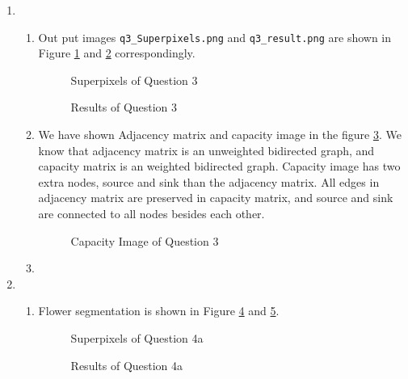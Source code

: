 \documentclass[12pt]{article}
\begin{document}
\begin{enumerate}
	


	\item
	\begin{enumerate}
		\item 
		 Out put images  \texttt{q3\_Superpixels.png} and \texttt{q3\_result.png} are shown in Figure \ref{fig:q3_1} and \ref{fig:q3_2} correspondingly.
		\begin{figure}[H]
			\centering{}
			\caption{Superpixels of Question 3}
			\label{fig:q3_1}
		\end{figure}
		\begin{figure}[H]
			\centering{}
			\caption{Results of Question 3}
			\label{fig:q3_2}
		\end{figure}
	
	\item We have shown Adjacency matrix and capacity image in the figure \ref{fig:q3_3}. We know that adjacency matrix is an unweighted bidirected graph, and capacity matrix is an weighted bidirected graph. Capacity image has two extra nodes, source and sink than the adjacency matrix. All edges in adjacency matrix are preserved in capacity matrix, and source and sink are connected to all nodes besides each other.
	\begin{figure}[H]
		\centering{}
		\caption{Capacity Image of Question 3}
		\label{fig:q3_3}
	\end{figure}

	\item 
	\end{enumerate}

	\item \begin{enumerate}
		\item Flower segmentation is shown in Figure \ref{fig:q4_1_1} and \ref{fig:q4_1_2}.
		\begin{figure}[H]
			\centering{}
			\caption{Superpixels of Question 4a}
			\label{fig:q4_1_1}
		\end{figure}
		\begin{figure}[H]
			\centering{}
			\caption{Results of Question 4a}
			\label{fig:q4_1_2}
		\end{figure}
	

\end{enumerate}
\end{enumerate}
\end{document}
